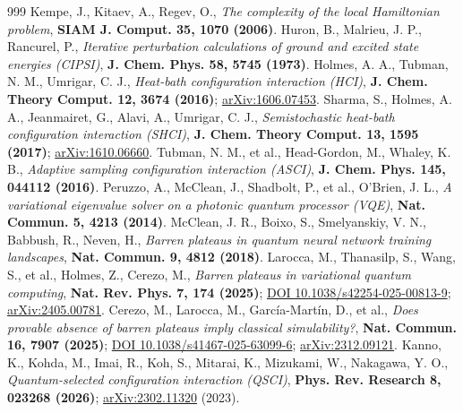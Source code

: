 \documentclass[onecolumn,a4paper]{quantumarticle}
\begin{document}
\begingroup
\footnotesize
\frenchspacing
\begin{thebibliography}{999}
\setlength{\itemsep}{0.2pt}\setlength{\parsep}{0pt}
 Kempe, J., Kitaev, A., Regev, O., \emph{The complexity of the local Hamiltonian problem}, \textbf{SIAM J. Comput. 35, 1070 (2006)}.
 Huron, B., Malrieu, J. P., Rancurel, P., \emph{Iterative perturbation calculations of ground and excited state energies (CIPSI)}, \textbf{J. Chem. Phys. 58, 5745 (1973)}.
 Holmes, A. A., Tubman, N. M., Umrigar, C. J., \emph{Heat-bath configuration interaction (HCI)}, \textbf{J. Chem. Theory Comput. 12, 3674 (2016)}; \href{https://arxiv.org/abs/1606.07453}{arXiv:1606.07453}.
 Sharma, S., Holmes, A. A., Jeanmairet, G., Alavi, A., Umrigar, C. J., \emph{Semistochastic heat-bath configuration interaction (SHCI)}, \textbf{J. Chem. Theory Comput. 13, 1595 (2017)}; \href{https://arxiv.org/abs/1610.06660}{arXiv:1610.06660}.
 Tubman, N. M., et al., Head-Gordon, M., Whaley, K. B., \emph{Adaptive sampling configuration interaction (ASCI)}, \textbf{J. Chem. Phys. 145, 044112 (2016)}.
 Peruzzo, A., McClean, J., Shadbolt, P., et al., O'Brien, J. L., \emph{A variational eigenvalue solver on a photonic quantum processor (VQE)}, \textbf{Nat. Commun. 5, 4213 (2014)}.
 McClean, J. R., Boixo, S., Smelyanskiy, V. N., Babbush, R., Neven, H., \emph{Barren plateaus in quantum neural network training landscapes}, \textbf{Nat. Commun. 9, 4812 (2018)}.
 Larocca, M., Thanasilp, S., Wang, S., et al., Holmes, Z., Cerezo, M., \emph{Barren plateaus in variational quantum computing}, \textbf{Nat. Rev. Phys. 7, 174 (2025)}; \href{https://doi.org/10.1038/s42254-025-00813-9}{DOI 10.1038/s42254-025-00813-9}; \href{https://arxiv.org/abs/2405.00781}{arXiv:2405.00781}.
 Cerezo, M., Larocca, M., García-Martín, D., et al., \emph{Does provable absence of barren plateaus imply classical simulability?}, \textbf{Nat. Commun. 16, 7907 (2025)}; \href{https://doi.org/10.1038/s41467-025-63099-6}{DOI 10.1038/s41467-025-63099-6}; \href{https://arxiv.org/abs/2312.09121}{arXiv:2312.09121}.
 Kanno, K., Kohda, M., Imai, R., Koh, S., Mitarai, K., Mizukami, W., Nakagawa, Y. O., \emph{Quantum-selected configuration interaction (QSCI)}, \textbf{Phys. Rev. Research 8, 023268 (2026)}; \href{https://arxiv.org/abs/2302.11320}{arXiv:2302.11320} (2023).

\end{thebibliography}
\end{document}
